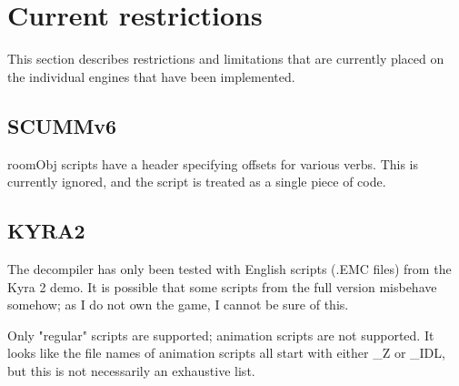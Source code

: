 \section{Current restrictions}
This section describes restrictions and limitations that are currently placed on the individual engines that have been implemented.

\subsection{SCUMMv6}
roomObj scripts have a header specifying offsets for various verbs. This is currently ignored, and the script is treated as a single piece of code.

\subsection{KYRA2}
The decompiler has only been tested with English scripts (.EMC files) from the Kyra 2 demo. It is possible that some scripts from the full version misbehave somehow; as I do not own the game, I cannot be sure of this.

Only "regular" scripts are supported; animation scripts are not supported. It looks like the file names of animation scripts all start with either \_Z or \_IDL, but this is not necessarily an exhaustive list.
